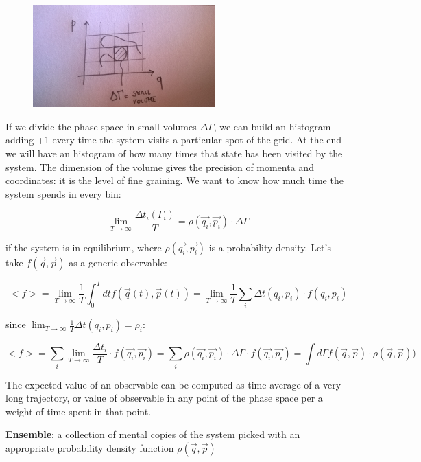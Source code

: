 \documentclass[a4paper, italian, openany]{book}
\begin{document}
\begin{figure}[H]
\centering
\includegraphics[width=70mm]{img/figure2.jpg}
\end{figure}

If we divide the phase space in small volumes $\Delta \Gamma$, we can build an histogram adding +1 every time the system visits a particular spot of the grid. At the end we will have an histogram of how many times that state has been visited by the system. The dimension of the volume gives the precision of momenta and coordinates: it is the level of fine graining.\newline
We want to know how much time the system spends in every bin:

$$\lim_{T \to \infty} \frac{\Delta t_i(\Gamma_i)}{T} = \rho(\overrightarrow{q_i}, \overrightarrow{p_i}) \cdot \Delta \Gamma$$ 

if the system is in equilibrium, where $\rho(\overrightarrow{q_i}, \overrightarrow{p_i})$ is a probability density.\newline
Let's take $f(\overrightarrow{q}, \overrightarrow{p})$ as a generic observable:

$$<f> = \lim_{T \to \infty} \frac{1}{T} \int_0^T dt f(\overrightarrow{q}(t), \overrightarrow{p}(t)) = \lim_{T \to \infty} \frac{1}{T}\sum_i \Delta t(q_i, p_i) \cdot f(q_i, p_i)$$

since $\lim_{T \to \infty} \frac{1}{T} \Delta t(q_i, p_i) = \rho_i$:

$$<f> = \sum_i \lim_{T \to \infty} \frac{\Delta t_i}{T} \cdot f(\overrightarrow{q_i}, \overrightarrow{p_i}) = \sum_i \rho(\overrightarrow{q_i}, \overrightarrow{p_i}) \cdot \Delta \Gamma \cdot f(\overrightarrow{q_i}, \overrightarrow{p_i}) = \int d\Gamma  f(\overrightarrow{q}, \overrightarrow{p})\cdot \rho(\overrightarrow{q}, \overrightarrow{p}))$$

The expected value of an observable can be computed as time average of a very long trajectory, or value of observable in any point of the phase space per a weight of time spent in that point.

\textbf{Ensemble}: a collection of mental copies of the system picked with an appropriate probability density function $\rho(\overrightarrow{q}, \overrightarrow{p})$
\end{document}
